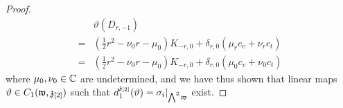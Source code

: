\begin{proof}
$$\begin{aligned}
                            & \vartheta( D_{r, -1} )
                            \\
                            = & \left( \frac12 r^2 - \nu_0 r - \mu_0 \right) K_{-r, 0} + \delta_{r, 0} ( \mu_r c_v + \nu_r c_t )
                            \\
                            = & \left( \frac12 r^2 - \nu_0 r - \mu_0 \right) K_{-r, 0} + \delta_{r, 0} ( \mu_0 c_v + \nu_0 c_t )
                        \end{aligned}
                    $$
                where $\mu_0, \nu_0 \in \mathbb{C}$ are undetermined, and we have thus shown that linear maps $\vartheta \in C_1(\mathfrak{w}, \mathfrak{z}_{[2]})$ such that $d_1^{\mathfrak{z}_{[2]}}(\vartheta) = \sigma_i|_{\bigwedge^2 \mathfrak{w}}$ exist.
            \end{proof}

